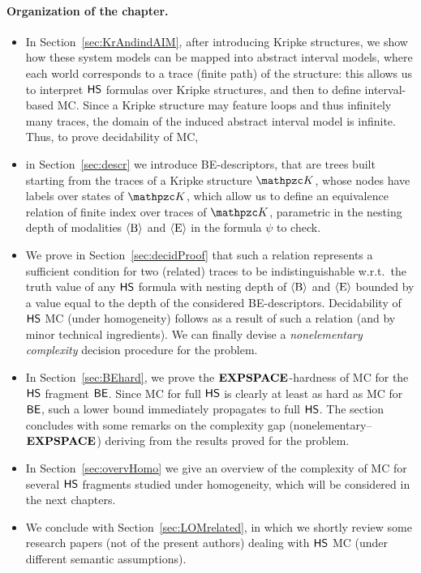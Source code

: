 \paragraph{Organization of the chapter.} 
\begin{itemize}
    \item In Section~\ref{sec:KrAndindAIM}, after introducing Kripke structures, we show how these system models can be mapped into abstract interval models, where each world corresponds to a trace (finite path) of the structure: this allows us to interpret $\text{\sffamily HS}$ formulas over Kripke structures, and then to define interval-based MC. Since a Kripke structure may feature loops and thus infinitely many traces, the domain of the induced abstract interval model is infinite.
    Thus, to prove decidability of MC,
    \item in Section~\ref{sec:descr} 
    we introduce BE-descriptors, that are trees built starting from the traces of a Kripke structure $\Ku$, whose nodes have labels over states of $\Ku$, which allow us to define an equivalence relation of finite index over traces of $\Ku$, parametric in the nesting depth of modalities $\operatorname{\langle B\rangle}$ and $\operatorname{\langle E\rangle}$ in the formula $\psi$ to check.
    \item We prove in Section~\ref{sec:decidProof} that such a relation represents a sufficient condition for two (related) traces to be indistinguishable w.r.t.\ the truth value of any $\text{\sffamily HS}$ formula with nesting depth of $\operatorname{\langle B\rangle}$ and $\operatorname{\langle E\rangle}$ bounded by a value equal to the depth of the considered BE-descriptors. Decidability of $\text{\sffamily HS}$ MC (under homogeneity) follows as a result of such a relation (and by minor technical ingredients). We can finally devise a \emph{nonelementary complexity} decision procedure for the problem.
    \item In Section~\ref{sec:BEhard}, we prove the $\textbf{EXPSPACE}$-hardness of MC for the $\text{\sffamily HS}$ fragment $\mathsf{BE}$. Since MC for full $\text{\sffamily HS}$ is clearly at least as hard as MC for $\mathsf{BE}$, such a lower bound immediately propagates to full $\text{\sffamily HS}$. The section concludes with some remarks on the complexity gap (nonelementary--$\textbf{EXPSPACE}$) deriving from the results proved for the problem.
    \item In Section~\ref{sec:overvHomo} we give an overview of the complexity of MC for several $\text{\sffamily HS}$ fragments studied under homogeneity, which will be considered in the next chapters.
    \item We conclude with Section~\ref{sec:LOMrelated}, in which we shortly review some research papers (not of the present authors) dealing with $\text{\sffamily HS}$ MC (under different semantic assumptions).
\end{itemize}

